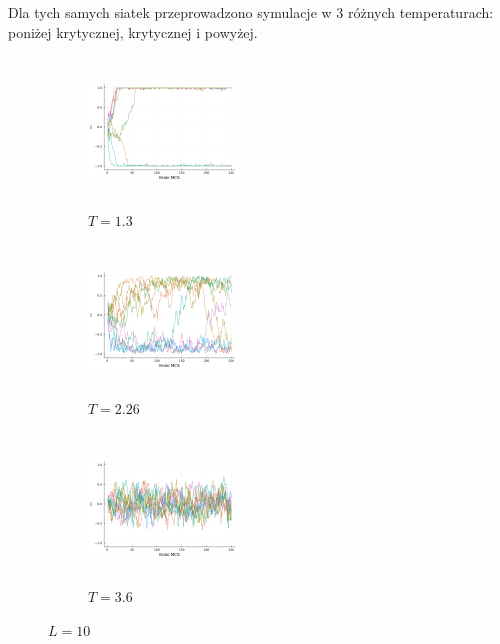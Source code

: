 \documentclass[12pt]{article}
\begin{document}
Dla tych samych siatek przeprowadzono symulacje w 3 różnych temperaturach: poniżej krytycznej, krytycznej i powyżej. 


\begin{figure}[H]
  \centering

  \begin{subfigure}[b]{0.3\linewidth}
    \centering
    \includegraphics[width=150px, height=150px]{../data/magnetizations/10_T1.3.png}
    \caption{$T=1.3$}
    \label{fig:image1}
  \end{subfigure}
  \hfill
  \begin{subfigure}[b]{0.3\linewidth}
    \centering
    \includegraphics[width=150px, height=150px]{../data/magnetizations/10_T2.26.png}
    \caption{$T=2.26$}
    \label{fig:image2}
  \end{subfigure}
  \hfill
  \begin{subfigure}[b]{0.3\linewidth}
    \centering
    \includegraphics[width=150px, height=150px]{../data/magnetizations/10_T3.6.png}
    \caption{$T=3.6$}
    \label{fig:image3}
  \end{subfigure}

  \caption{$L=10$}
  \label{fig:series}
\end{figure}
\end{document}
